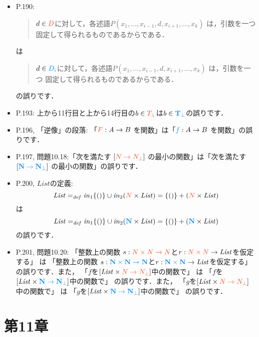 \documentclass[12pt,titlepage,twoside,openright,dvipdfmx]{jsbook}
\newcommand\old[1]{%
  \textcolor[rgb]{1.0,0.25,0.1}{#1}%
  }
\newcommand\new[1]{%
  \textcolor[rgb]{0,0.55,1.0}{#1}%
  }
\theoremstyle{definition}
\begin{document}
\ifnum{}
\ifnum{}
\begin{itemize}
\item P.190:
  \begin{quote}
    $d\in \old{D}$に対して，各述語$P(x_1,\ldots,x_{i-1},d,x_{i+1},\ldots,x_k)$ は，引数を一つ
    固定して得られるものであるから\inclusive{}である．
  \end{quote}
  は
  \begin{quote}
    $d\in \new{D_i}$に対して，各述語$P(x_1,\ldots,x_{i-1},d,x_{i+1},\ldots,x_k)$ は，引数を一つ
    固定して得られるものであるから\inclusive{}である．
  \end{quote}
  の誤りです．
\item P.193: 上から11行目と上から14行目の$b\in \old{T_\bot}$は$b\in \new{\mathbf{T}_\bot}$の誤りです．
\item P.196, 「逆像」の段落: 「$\old{F}:A\to B$ を関数」は「$\new{f}:A\to B$ を関数」の誤りです．
\item P.197, 問題10.18:「次を満たす $[\old{N\to N_\bot}]$ の最小の関数」は「次を満たす $[\new{\mathbf{N}\to \mathbf{N}_\bot}]$ の最小の関数」の誤りです．
\item P.200, $\mathit{List}$の定義:
  \[
    {\it List} =_{\mathit{def}} {\it in}_1\{()\} \cup {\it in}_2(\old{N}\times{\it List}) =
    \{()\} + (\old{N}\times{\it List})
  \]
  は
  \[
    {\it List} =_{\mathit{def}} {\it in}_1\{()\} \cup {\it in}_2(\new{\mathbf{N}}\times{\it List}) =
    \{()\} + (\new{\mathbf{N}}\times{\it List})
  \]
  の誤りです．
\item P.201, 問題10.20:
  「整数上の関数 $s:\old{N\times N\to N}$と$r:\old{N\times N}\to{\it List}$を仮定する」
  は
  「整数上の関数 $s:\new{\mathbf{N}\times \mathbf{N}\to \mathbf{N}}$と$r:\new{\mathbf{N}\times \mathbf{N}}\to{\it List}$を仮定する」
  の誤りです．また，
  「$f$を$[{\it List}\times \old{N\to N_\bot}]$中の関数で」
  は
  「$f$を$[{\it List}\times \new{\mathbf{N}\to \mathbf{N}_\bot}]$中の関数で」
  の誤りです．また，
  「$g$を$[{\it List}\times \old{N\to N_\bot}]$中の関数で」
  は
  「$g$を$[{\it List}\times \new{\mathbf{N}\to \mathbf{N}_\bot}]$中の関数で」
  の誤りです．
\end{itemize}
\fi
\fi
\section*{第11章}
\end{document}
